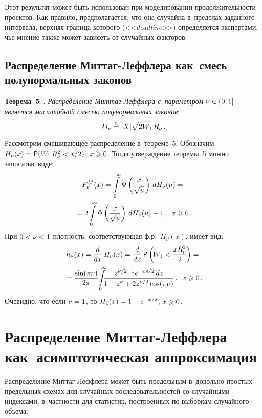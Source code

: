 \begin{multicols}{2}
\smallskip

Этот результат может быть использован при моделировании
продолжительности проектов. Как правило, предполагается, что она
случайна в~пределах заданного интервала, верхняя граница которого
(<<{\it deadline}>>) определяется экспертами, чье мнение также может
зависеть от случайных факторов.

\subsection{Распределение Миттаг-Леффлера как~смесь полунормальных законов}

\noindent
\textbf{Теорема~5}~\cite{KorolevZeifman2017}. \textit{Распределение
Мит\-таг-Леф\-фле\-ра с~параметром $\nu\hm\in(0,1]$ является масштабной
смесью полунормальных законов}:
$$
M_{\nu}\stackrel{\mathrm{d}}{=} |X|\sqrt{2W_1}\,R_{\nu}\,.
$$

\smallskip

Рассмотрим смешивающее распределение в~тео\-ре\-ме~5. Обозначим
$H_{\nu}(x)\hm={\sf P}(W_1\,R_{\nu}^2\hm<{x}/{2})$, $x\hm\geqslant0$. Тогда
утверждение теоремы~5 можно записать\linebreak в~виде:
\begin{multline*}
F_{\nu}^{M}(x)=\int\limits_{0}^{\infty}\Psi\left(\displaystyle\frac{\displaystyle x\mathstrut}{\displaystyle \sqrt{u}\mathstrut}\right)\,dH_{\nu}(u)={}\\
{}=
2\int\limits_{0}^{\infty}\Phi\left(\displaystyle\frac{\displaystyle x\mathstrut}{\displaystyle \sqrt{u}\mathstrut}\right)\,dH_{\nu}(u)-1\,,\enskip
x\geqslant0\,.
\end{multline*}
При $0<\nu\hm<1$ плотность, соответствующая ф.р.~$H_{\nu}(x)$, имеет вид:
\begin{multline*}
h_{\nu}(x)=\displaystyle\frac{\displaystyle d\mathstrut}{\displaystyle dx\mathstrut}\,H_{\nu}(x)=\displaystyle\frac{\displaystyle d\mathstrut}{\displaystyle dx\mathstrut}\,{\sf P}
\left(\!W_1<\displaystyle\frac{\displaystyle xR_{\nu}^2\mathstrut}{\displaystyle 2\mathstrut}\!\right)={}\\
{}=
\displaystyle\frac{\displaystyle \sin(\pi\nu)\mathstrut}{\displaystyle 2\pi\mathstrut}\!\int\limits_{0}^{\infty}\!\!\!
\displaystyle\frac{\displaystyle z^{\nu/2-1}e^{-xz/2}\,dz\mathstrut}{\displaystyle 1+z^{\nu}+2z^{\nu/2}\cos(\pi\nu)\mathstrut}\,,
\enskip x\geqslant0\,.
\end{multline*}
Очевидно, что если $\nu\hm=1$, то $H_1(x)\hm=1\hm-e^{-x/2}$, $x\hm\geqslant0$.

\section{Распределение Миттаг-Леффлера как~асимптотическая
аппроксимация}

Распределение Мит\-таг-Леф\-фле\-ра может быть предельным в~довольно
простых предельных схемах для случайных последовательностей со
случайными индексами, в~частности для статистик, построенных по
выборкам случайного объема.


\end{multicols}
